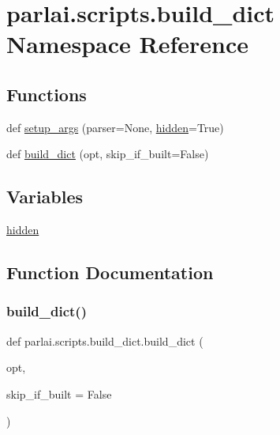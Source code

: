 \hypertarget{namespaceparlai_1_1scripts_1_1build__dict}{}\section{parlai.\+scripts.\+build\+\_\+dict Namespace Reference}
\label{namespaceparlai_1_1scripts_1_1build__dict}
\subsection*{Functions}
\begin{DoxyCompactItemize}
\item 
def \hyperlink{namespaceparlai_1_1scripts_1_1build__dict_a01e78707ace903aa772ada53fafe7067}{setup\+\_\+args} (parser=None, \hyperlink{namespaceparlai_1_1scripts_1_1build__dict_ab1670dd829e6129c8e3da84dd474da60}{hidden}=True)
\item 
def \hyperlink{namespaceparlai_1_1scripts_1_1build__dict_a3a0381817d7188331ee38b4a4627dbe0}{build\+\_\+dict} (opt, skip\+\_\+if\+\_\+built=False)
\end{DoxyCompactItemize}
\subsection*{Variables}
\begin{DoxyCompactItemize}
\item 
\hyperlink{namespaceparlai_1_1scripts_1_1build__dict_ab1670dd829e6129c8e3da84dd474da60}{hidden}
\end{DoxyCompactItemize}


\subsection{Function Documentation}
\mbox{\label{namespaceparlai_1_1scripts_1_1build__dict_a3a0381817d7188331ee38b4a4627dbe0}} 
\subsubsection{\texorpdfstring{build\+\_\+dict()}{build\_dict()}}
{\footnotesize\ttfamily def parlai.\+scripts.\+build\+\_\+dict.\+build\+\_\+dict (\begin{DoxyParamCaption}\item[{}]{opt,  }\item[{}]{skip\+\_\+if\+\_\+built = {\ttfamily False} }\end{DoxyParamCaption})}

